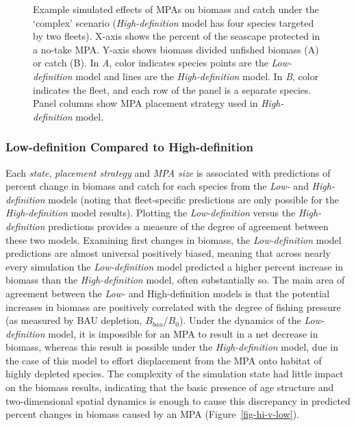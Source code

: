 \documentclass[
  default,
  lineno,
  referee]{sn-jnl}
\begin{document}
\begin{figure}


\caption{\label{fig-eg-complex}Example simulated effects of MPAs on
biomass and catch under the `complex' scenario (\emph{High-definition}
model has four species targeted by two fleets). X-axis shows the percent
of the seascape protected in a no-take MPA. Y-axis shows biomass divided
unfished biomass (A) or catch (B). In \emph{A}, color indicates species
points are the \emph{Low-definition} model and lines are the
\emph{High-definition} model. In \emph{B}, color indicates the fleet,
and each row of the panel is a separate species. Panel columns show MPA
placement strategy used in \emph{High-definition} model.}

\end{figure}%

\subsubsection{Low-definition Compared to
High-definition}\label{sec-compare}

Each \emph{state}, \emph{placement strategy} and \emph{MPA size} is
associated with predictions of percent change in biomass and catch for
each species from the \emph{Low-} and \emph{High-definition} models
(noting that fleet-specific predictions are only possible for the
\emph{High-definition} model results). Plotting the
\emph{Low-definition} versus the \emph{High-definition} predictions
provides a measure of the degree of agreement between these two models.
Examining first changes in biomass, the \emph{Low-definition} model
predictions are almost universal positively biased, meaning that across
nearly every simulation the \emph{Low-definition} model predicted a
higher percent increase in biomass than the \emph{High-definition}
model, often substantially so. The main area of agreement between the
\emph{Low-} and High-definition models is that the potential increases
in biomass are positively correlated with the degree of fishing pressure
(as measured by BAU depletion, \(B_{bau}/B_0\)). Under the dynamics of
the \emph{Low-definition} model, it is impossible for an MPA to result
in a net decrease in biomass, whereas this result is possible under the
\emph{High-definition} model, due in the case of this model to effort
displacement from the MPA onto habitat of highly depleted species. The
complexity of the simulation state had little impact on the biomass
results, indicating that the basic presence of age structure and
two-dimensional spatial dynamics is enough to cause this discrepancy in
predicted percent changes in biomass caused by an MPA
(Figure~\ref{fig-hi-v-low}).
\end{document}
